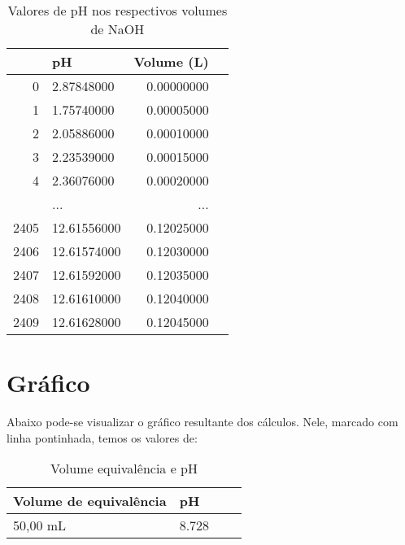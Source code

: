 \documentclass[a4paper, 12pt]{report}
\begin{document}
\begin{table}[H]
	\begin{center}
		\caption{Valores de pH nos respectivos volumes de NaOH}
		\label{demo-table}
		\begin{tabular}{rp{5cm}rp{5cm}}\toprule
			& \textbf{pH} & \textbf{Volume (L)} \\ \midrule			
			0 & 2.87848000 & 0.00000000 \\ 
			1 & 1.75740000 & 0.00005000 \\ 
			2 & 2.05886000 & 0.00010000 \\
			3 & 2.23539000 & 0.00015000 \\
			4 & 2.36076000 & 0.00020000 \\
			& ... & ... \\
			2405 & 12.61556000 & 0.12025000 \\
			2406 & 12.61574000 & 0.12030000 \\
			2407 & 12.61592000 & 0.12035000 \\
			2408 & 12.61610000 & 0.12040000 \\
			2409 & 12.61628000 & 0.12045000 \\
			\bottomrule
		\end{tabular}
	\end{center}
\end{table}

\section{Gráfico}
Abaixo pode-se visualizar o gráfico resultante dos cálculos. Nele, marcado com linha pontinhada, temos os valores de:

\begin{table}[H]
	\begin{center}
		\caption{Volume equivalência e pH}
		\label{tabela_vol_eq_e_pH}\textbf{}
		\begin{tabular}{lp{5cm}lp{10cm}}\toprule
			\textbf{Volume de equivalência} & \textbf{pH} \\ \midrule
			50,00 mL & 8.728 \\ 
			\bottomrule
		\end{tabular}
	\end{center}
\end{table}

\end{document}
